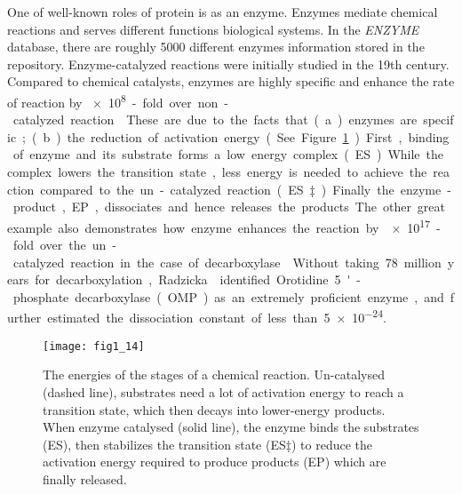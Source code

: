 \begin{refsection}
One of well-known roles of protein is as an enzyme. Enzymes mediate chemical
reactions and serves different functions biological systems. In the  
\emph{ENZYME} database, there are roughly 5000 different enzymes information
stored in the repository.  Enzyme-catalyzed reactions were initially studied in
the 19th century\cite{AthelCornish-Bowden2012}. Compared to chemical catalysts,
enzymes are highly specific and enhance the rate of reaction by
\SI{e8}-fold over non-catalyzed reaction\cite{Stryer1995}. These
are due to the facts that (a) enzymes are specific; (b) the reduction of
activation energy. (See Figure \ref{fig:enzyme-intro}) First, binding of enzyme
and its substrate forms a low energy complex (ES). While the complex lowers the
transition state, less energy is needed to achieve the reaction compared to the
un-catalyzed reaction (ES‡). Finally the enzyme-product, EP,  dissociates and
hence releases the products. The other great example also demonstrates how
enzyme enhances the reaction by \SI{e17}-fold over the
un-catalyzed reaction in the case of decarboxylase\cite{Radzicka1995}. Without
taking 78 million years for decarboxylation, Radzicka  identified
Orotidine 5'-phosphate decarboxylase (OMP) as an extremely proficient enzyme,
and further estimated the dissociation constant of less than
\SI{5e-24}{\Molar}.
\begin{figure}[h!] 
    \centering \texttt{[image: fig1\_14]}
    \caption[The energies of the stages of a chemical reaction. Uncatalysed
    (dashed line), substrates need a lot of activation energy to reach a
transition state, which then decays into lower-energy products. When enzyme
catalysed (solid line), the enzyme binds the substrates (ES), then stabilizes
the transition state (ES‡) to reduce the activation energy required to produce
products (EP) which are finally released.]{The energies of the stages of a
    chemical reaction. Un-catalysed (dashed line), substrates need a lot of
    activation energy to reach a transition state, which then decays into
    lower-energy products. When enzyme catalysed (solid line), the enzyme binds
    the substrates (ES), then stabilizes the transition state (ES‡) to reduce
    the activation energy required to produce products (EP) which are finally
    released\cite{Berg2002}.} 
    \label{fig:enzyme-intro}
\end{figure}


\end{refsection}
